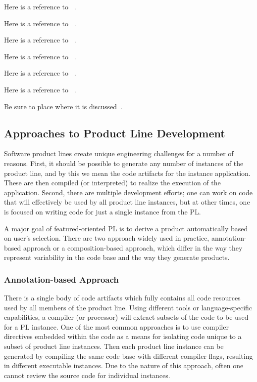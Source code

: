 Here is a reference to ~\cite{Arcaini:2017:ARV:3106195.3106206}.

Here is a reference to ~\cite{Heineman:2015:TMO:2791060.2791076}.

Here is a reference to ~\cite{Vasilevskiy:2016:TRP:2934466.2934484}.

Here is a reference to ~\cite{Kuhn:2015:CPC:2791060.2791092}.

Here is a reference to ~\cite{Schaefer:2010:DPS:1885639.1885647}.

Here is a reference to ~\cite{Apel:2013:FSP:2541773}.




Be sure to place where it is discussed~\cite{CIDE:Eclipse}.


\subsection{Approaches to Product Line Development}

Software product lines create unique engineering challenges for a number of reasons. First, it should be
possible to generate any number of  instances of the product line, and by this we mean the code artifacts
for the instance application. These are then compiled (or interpreted) to realize the execution of the
application. Second, there are multiple development efforts; one can work on code that will effectively be
used by all product line instances, but at other times, one is focused on writing code for just a single
instance from the PL.

A major goal of featured-oriented PL is to derive a product automatically based on user’s selection. There are
two approach widely used in practice,  annotation-based approach or a composition-based approach, which differ in
the way they represent variability in the code base and the way they generate products.


\subsubsection{Annotation-based Approach}

There is a single body of code artifacts which fully contains all code resources used by all members of the product line.
Using different tools or language-specific capabilities, a compiler (or processor) will extract subsets of the code to be used
 for a PL instance. One of the most common approaches is to use compiler directives embedded within the code as a means
 for isolating code unique to a subset of product line instances. Then each product line instance can be generated
 by compiling the same code base with different compiler flags, resulting in different executable instances.
 Due to the nature of this approach, often one cannot review the source code for individual instances.

